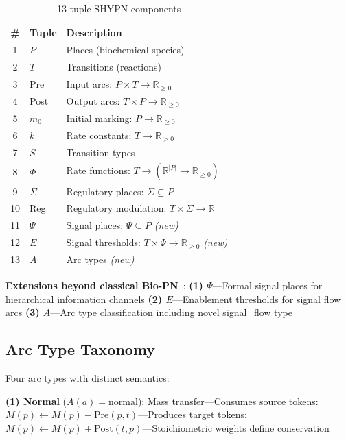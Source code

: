 \documentclass[twocolumn,11pt]{article}
\begin{document}
\begin{table}[h]
\caption{13-tuple SHYPN components}
\centering
\small
\begin{tabular}{@{}cp{1.0cm}p{5.8cm}@{}}
\toprule
\# & \textbf{Tuple} & \textbf{Description} \\
\midrule
1 & $P$ & Places (biochemical species) \\
2 & $T$ & Transitions (reactions) \\
3 & Pre & Input arcs: $P \times T \to \mathbb{R}_{\geq 0}$ \\
4 & Post & Output arcs: $T \times P \to \mathbb{R}_{\geq 0}$ \\
5 & $m_0$ & Initial marking: $P \to \mathbb{R}_{\geq 0}$ \\
6 & $k$ & Rate constants: $T \to \mathbb{R}_{> 0}$ \\
7 & $S$ & Transition types \\
8 & $\Phi$ & Rate functions: $T \to (\mathbb{R}^{|P|} \to \mathbb{R}_{\geq 0})$ \\
9 & $\Sigma$ & Regulatory places: $\Sigma \subseteq P$ \\
10 & Reg & Regulatory modulation: $T \times \Sigma \to \mathbb{R}$ \\
11 & $\Psi$ & Signal places: $\Psi \subseteq P$ \textit{(new)} \\
12 & $E$ & Signal thresholds: $T \times \Psi \to \mathbb{R}_{\geq 0}$ \textit{(new)} \\
13 & $A$ & Arc types \textit{(new)} \\
\bottomrule
\end{tabular}
\end{table}

\vspace{3pt}
\noindent\textbf{Extensions beyond classical Bio-PN}~\cite{heiner2008}: \textbf{(1) $\Psi$}---Formal signal places for hierarchical information channels \textbf{(2) $E$}---Enablement thresholds for signal flow arcs \textbf{(3) $A$}---Arc type classification including novel signal\_flow type

\subsection{Arc Type Taxonomy}

\vspace{3pt}
\noindent Four arc types with distinct semantics:

\vspace{3pt}
\noindent\textbf{(1) Normal} ($A(a) = \text{normal}$): Mass transfer---Consumes source tokens: $M(p) \gets M(p) - \text{Pre}(p, t)$---Produces target tokens: $M(p) \gets M(p) + \text{Post}(t, p)$---Stoichiometric weights define conservation
\end{document}
